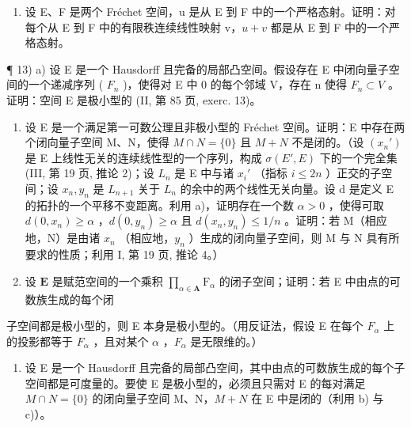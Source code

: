 \begin{enumerate}
\def\labelenumi{\arabic{enumi})}
\setcounter{enumi}{11}
\tightlist
\item
  设 E、F 是两个 Fréchet 空间，u 是从 E 到 F 中的一个严格态射。证明：对每个从 E 到 F 中的有限秩连续线性映射 v，\(u + v\) 都是从 E 到 F 中的一个严格态射。
\end{enumerate}

¶ 13) a) 设 E 是一个 Hausdorff 且完备的局部凸空间。假设存在 E 中闭向量子空间的一个递减序列 ( \(F_{n}\) )，使得对 E 中 0 的每个邻域 V，存在 n 使得 \(F_{n} \subset V\) 。证明：空间 E 是极小型的 (II, 第 85 页, exerc. 13)。

\begin{enumerate}
\def\labelenumi{\alph{enumi})}
\setcounter{enumi}{1}
\item
  设 E 是一个满足第一可数公理且非极小型的 Fréchet 空间。证明：E 中存在两个闭向量子空间 M、N，使得 \(M \cap N = \{0\}\) 且 \(M + N\) 不是闭的。（设 \((x_{n}')\) 是 E 上线性无关的连续线性型的一个序列，构成 \(\sigma(E', E)\) 下的一个完全集 (III, 第 19 页, 推论 2)；设 \(L_{n}\) 是 E 中与诸 \(x_{i}'\) （指标 \(i \leqslant 2n\) ）正交的子空间；设 \(x_{n}, y_{n}\) 是 \(L_{n+1}\) 关于 \(L_{n}\) 的余中的两个线性无关向量。设 d 是定义 E 的拓扑的一个平移不变距离。利用 a)，证明存在一个数 \(\alpha > 0\) ，使得可取 \(d(0, x_{n}) \geqslant \alpha\) ，\(d(0, y_{n}) \geqslant \alpha\) 且 \(d(x_{n}, y_{n}) \leqslant 1/n\) 。证明：若 M（相应地，N）是由诸 \(x_{n}\) （相应地，\(y_{n}\) ）生成的闭向量子空间，则 M 与 N 具有所要求的性质；利用 I, 第 19 页, 推论 4。）
\item
  设 \(\mathbf{E}\) 是赋范空间的一个乘积 \(\prod_{\alpha \in \mathbf{A}} \mathrm{F}_{\alpha}\) 的闭子空间；证明：若 E 中由点的可数族生成的每个闭
\end{enumerate}

子空间都是极小型的，则 E 本身是极小型的。（用反证法，假设 E 在每个 \(F_{\alpha}\) 上的投影都等于 \(F_{\alpha}\) ，且对某个 \(\alpha\) ，\(F_{\alpha}\) 是无限维的。）

\begin{enumerate}
\def\labelenumi{\alph{enumi})}
\setcounter{enumi}{3}
\tightlist
\item
  设 E 是一个 Hausdorff 且完备的局部凸空间，其中由点的可数族生成的每个子空间都是可度量的。要使 E 是极小型的，必须且只需对 E 的每对满足 \(M \cap N = \{0\}\) 的闭向量子空间 M、N，\(M + N\) 在 E 中是闭的（利用 b) 与 c)）。
\end{enumerate}


